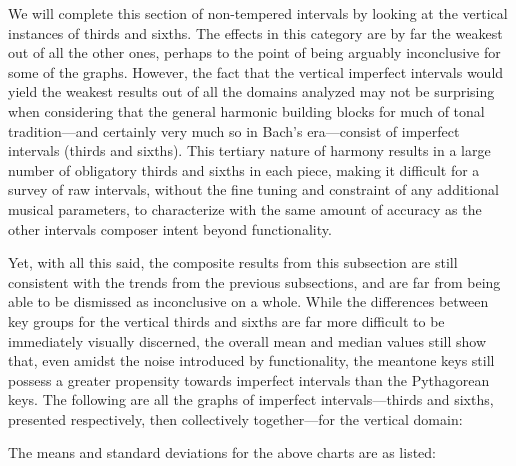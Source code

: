 We will complete this section of non-tempered intervals by looking at
the vertical instances of thirds and sixths. The effects in this
category are by far the weakest out of all the other ones, perhaps to
the point of being arguably inconclusive for some of the graphs.
However, the fact that the vertical imperfect intervals would yield the
weakest results out of all the domains analyzed may not be surprising
when considering that the general harmonic building blocks for much of
tonal tradition---and certainly very much so in Bach's
era---consist of imperfect intervals (thirds and sixths). This
tertiary nature of harmony results in a large number of obligatory
thirds and sixths in each piece, making it difficult for a survey of raw
intervals, without the fine tuning and constraint of any additional
musical parameters, to characterize with the same amount of accuracy as
the other intervals composer intent beyond functionality.

Yet, with all this said, the composite results from this subsection are
still consistent with the trends from the previous subsections, and are
far from being able to be dismissed as inconclusive on a whole. While
the differences between key groups for the vertical thirds and sixths
are far more difficult to be immediately visually discerned, the overall
mean and median values still show that, even amidst the noise introduced
by functionality, the meantone keys still possess a greater propensity
towards imperfect intervals than the Pythagorean keys. The following are
all the graphs of imperfect intervals---thirds and sixths, presented
respectively, then collectively together---for the vertical domain:


    \begin{center}
    \end{center}
    

    \begin{center}
    \end{center}
    


    \begin{center}
    \end{center}
    
    The means and standard deviations for the above charts are as listed:


